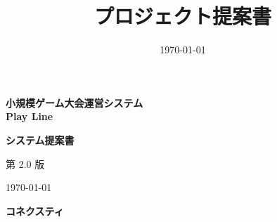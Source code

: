 \documentclass[a4paper]{ltjsarticle}
\title{プロジェクト提案書}
\author{}
\date{\today}
\begin{document}
\begin{titlepage}
    \centering
    \thispagestyle{empty} %

    \vspace*{3cm}

    {\Huge \bfseries 小規模ゲーム大会運営システム \\[0.3em] Play Line \par}

    \vspace{1.5cm}

    {\LARGE \bfseries システム提案書 \par}

    \vspace{3.5cm}

    {\Large 第 2.0 版 \par}

    \vfill %

    {\large \today \par}

    \vspace{1.2cm}

    {\Large \bfseries コネクスティ \par}

    \vspace{1cm}
\end{titlepage}

\clearpage
{}

\tableofcontents
\clearpage




% 







\end{document}
